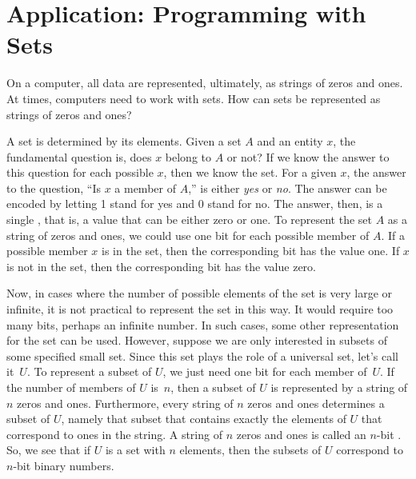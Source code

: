 \section{Application: Programming with Sets}\label{S-sets-3}

On a computer, all data are represented, ultimately, as strings
of zeros and ones.  At times, computers need to work with
sets.  How can sets be represented as strings of zeros and ones?

A set is determined by its elements.  Given a set $A$ and an
entity $x$, the fundamental question is, does $x$ belong to $A$
or not?  If we know the answer to this question for each possible
$x$, then we know the set.  For a given $x$, the answer to the
question, ``Is $x$ a member of $A$,'' is either \textit{yes} or
\textit{no}.  The answer can be encoded by letting 1 stand for
yes and 0 stand for no.  The answer, then, is a single
, that is, a value that can be either zero or one.
To represent the set $A$ as a string of zeros and ones, 
we could use one bit for each possible member of $A$.
If a possible member $x$ is in the set, then the corresponding
bit has the value one.  If $x$ is not in the set, then the
corresponding bit has the value zero.

Now, in cases where the number of possible elements of the set
is very large or infinite, it is not practical to represent the
set in this way.  It would require too many bits, perhaps an infinite
number.  In such cases, some other representation for the set
can be used.  However, suppose we are only interested in subsets
of some specified small set.  Since this set plays the role of
a universal set, let's call it~$U$.  To represent a subset of
$U$, we just need one bit for each member of~$U$.  If the number of members
of $U$ is~$n$, then a subset of $U$ is represented by a string
of $n$ zeros and ones.  Furthermore, every string of $n$ zeros
and ones determines a subset of $U$, namely that subset
that contains exactly the elements of $U$ that correspond to
ones in the string.  A string of $n$ zeros and ones is
called an $n$-bit .  So, we see that if
$U$ is a set with $n$ elements, then the subsets of $U$ correspond
to $n$-bit binary numbers.

